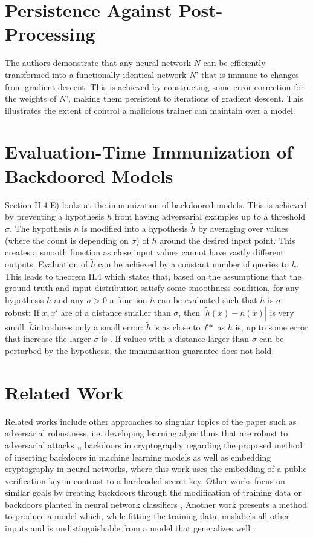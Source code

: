 \documentclass[
	fontsize=12pt,
	headings=small,
	parskip=quarter,
	bibliography=totoc,
	numbers=noenddot,       
	open=any,               
 	final                   
]{scrreprt}
\begin{document}
\section{Persistence Against Post-Processing}
The authors demonstrate that any neural network $N$ can be efficiently transformed into a functionally identical network $N’$ that is immune to changes from gradient descent. This is achieved by constructing some error-correction for the weights of $N’$, making them persistent to iterations of gradient descent. This illustrates the extent of control a malicious trainer can maintain over a model.  



\section{Evaluation-Time Immunization of Backdoored Models}
Section II.4 E) looks at the immunization of backdoored models. This is achieved by preventing a hypothesis $h$ from having adversarial examples up to a threshold $\sigma$. The hypothesis $h$ is modified into a hypothesis $\tilde{h}$ by averaging over values (where the count is depending on $\sigma$) of $h$ around the desired input point. This creates a smooth function as close input values cannot have vastly different outputs. Evaluation of $\tilde{h}$ can be achieved by a constant number of queries to $h$. This leads to theorem II.4 which states that, based on the assumptions that the ground truth and input distribution satisfy some smoothness condition, for any hypothesis $h$ and any $\sigma > 0$ a function $\tilde{h}$ can be evaluated such that  $\tilde{h}$ is $\sigma$-robust: If $x,x'$ are of a distance smaller than $\sigma$, then $|\tilde{h}(x)-h(x)|$ is very small. $\tilde{h}$introduces only a small error: $\tilde{h}$ is as close to $f*$ as $h$ is, up to some error that increase the larger $\sigma$ is \cite{goldwasser2022backdoors}.  If values with a distance larger than $\sigma$ can be perturbed by the hypothesis, the immunization guarantee does not hold.  



\section{Related Work}
Related works include other approaches to singular topics of the paper such as adversarial robustness, i.e. developing learning algorithms that are robust to adversarial attacks \cite{pmlr-v117-garg20a},\cite{pmlr-v97-bubeck19a}, backdoors in cryptography regarding the proposed method of inserting backdoors in machine learning models \cite{4031390} as well as embedding cryptography in neural networks, where this work uses the embedding of a public verification key in contrast to a hardcoded secret key. Other works focus on similar goals by creating backdoors through the modification of training data or backdoors planted in neural network classifiers \cite{8685687}, \cite{NEURIPS2022_3538a22c} Another work presents a method to produce a model which, while fitting the training data, mislabels all other inputs and is undistinguishable from a model that generalizes well \cite{moitra2022spoofinggeneralizationcanttrust}. 




\end{document}
